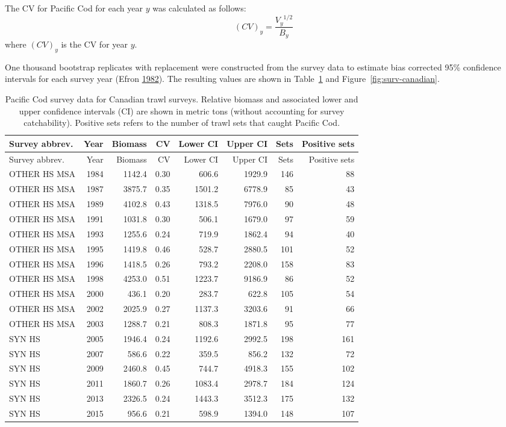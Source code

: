 \documentclass[11pt]{book}
\begin{document}
The CV for Pacific Cod for each year \(y\) was calculated as follows:
\begin{equation}
  (CV)_y=\frac{{V_y}^{1/2}}{B_y}
  \label{eq:sweptareacv}
\end{equation}
where \((CV)_y\) is the CV for year \(y\).

One thousand bootstrap replicates with replacement were constructed from the survey data to estimate bias corrected 95\% confidence intervals for each survey year (Efron \protect\hyperlink{ref-efron1982}{1982}). The resulting values are shown in Table~\ref{tab:surv-canadian-table} and Figure~\ref{fig:surv-canadian}.
\begin{longtable}[]{@{}lrrrrrrr@{}}
\caption{\label{tab:surv-canadian-table}Pacific Cod survey data for Canadian trawl surveys. Relative biomass and associated lower and upper confidence intervals (CI) are shown in metric tons (without accounting for survey catchability). Positive sets refers to the number of trawl sets that caught Pacific Cod.}\tabularnewline
\toprule
Survey abbrev. & Year & Biomass & CV & Lower CI & Upper CI & Sets & Positive sets\tabularnewline
\midrule
\endfirsthead
\toprule
Survey abbrev. & Year & Biomass & CV & Lower CI & Upper CI & Sets & Positive sets\tabularnewline
\midrule
\endhead
OTHER HS MSA & 1984 & 1142.4 & 0.30 & 606.6 & 1929.9 & 146 & 88\tabularnewline
OTHER HS MSA & 1987 & 3875.7 & 0.35 & 1501.2 & 6778.9 & 85 & 43\tabularnewline
OTHER HS MSA & 1989 & 4102.8 & 0.43 & 1318.5 & 7976.0 & 90 & 48\tabularnewline
OTHER HS MSA & 1991 & 1031.8 & 0.30 & 506.1 & 1679.0 & 97 & 59\tabularnewline
OTHER HS MSA & 1993 & 1255.6 & 0.24 & 719.9 & 1862.4 & 94 & 40\tabularnewline
OTHER HS MSA & 1995 & 1419.8 & 0.46 & 528.7 & 2880.5 & 101 & 52\tabularnewline
OTHER HS MSA & 1996 & 1418.5 & 0.26 & 793.2 & 2208.0 & 158 & 83\tabularnewline
OTHER HS MSA & 1998 & 4253.0 & 0.51 & 1223.7 & 9186.9 & 86 & 52\tabularnewline
OTHER HS MSA & 2000 & 436.1 & 0.20 & 283.7 & 622.8 & 105 & 54\tabularnewline
OTHER HS MSA & 2002 & 2025.9 & 0.27 & 1137.3 & 3203.6 & 91 & 66\tabularnewline
OTHER HS MSA & 2003 & 1288.7 & 0.21 & 808.3 & 1871.8 & 95 & 77\tabularnewline
SYN HS & 2005 & 1946.4 & 0.24 & 1192.6 & 2992.5 & 198 & 161\tabularnewline
SYN HS & 2007 & 586.6 & 0.22 & 359.5 & 856.2 & 132 & 72\tabularnewline
SYN HS & 2009 & 2460.8 & 0.45 & 744.7 & 4918.3 & 155 & 102\tabularnewline
SYN HS & 2011 & 1860.7 & 0.26 & 1083.4 & 2978.7 & 184 & 124\tabularnewline
SYN HS & 2013 & 2326.5 & 0.24 & 1443.3 & 3512.3 & 175 & 132\tabularnewline
SYN HS & 2015 & 956.6 & 0.21 & 598.9 & 1394.0 & 148 & 107\tabularnewline

\end{longtable}
\end{document}
